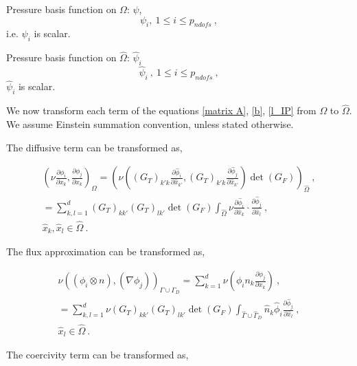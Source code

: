 \documentclass[a4paper,oneside,openright,spanish,english]{book}
\begin{document}
Pressure basis function on $\Omega$: $\psi$,
\begin{equation}
\psi_i, \  1 \leq i \leq p_{ndofs} \ ,
\end{equation}
i.e. $\psi_i$ is scalar.

Pressure basis function on $\hat{\Omega}$: $\hat{\psi}_i$  
\begin{equation}
\hat{\psi}_i \ , \ 1 \leq i \leq p_{ndofs} \ ,
\end{equation}
$\hat{\psi}_i$ is scalar.

We now transform each term of the equations \eqref{matrix A}, \eqref{b}, \eqref{l_IP} from $\Omega$ to $\hat{\Omega}$. We assume Einstein summation convention, unless stated otherwise.

The diffusive term can be transformed as,

\begin{equation}\label{affine_diffusive_term}
\begin{split}
(\nu \frac{\partial \phi_i}{\partial x_k} , \frac{\partial \phi_j}{\partial x_k})_{\Omega} = (\nu ((G_T)_{k'k}\frac{\partial \hat{\phi}_i}{\partial \hat{x}_{k'}}, (G_T)_{k'k}\frac{\partial \hat{\phi}_j}{\partial \hat{x}_{k'}})\det(G_F))_{\hat{\Omega}} \ , \\
= \sum_{k,l=1}^{d} (G_T)_{kk'} (G_T)_{lk'} \det(G_F) \int_{\hat{\Omega}} \nu \frac{\partial \hat{\phi}_i}{\partial \hat{x}_k} \cdot \frac{\partial \hat{\phi}_j}{\partial \hat{x}_l} \ , \\
\hat{x}_k, \hat{x}_l \in \hat{\Omega} \ .
\end{split}
\end{equation}

The flux approximation can be transformed as,

\begin{equation}\label{affine_flux_term}
\begin{split}
\nu ((\phi_i \otimes n),(\nabla \phi_j))_{\Gamma \cup \Gamma_D} = \sum_{k=1}^d \nu (\phi_i n_k \frac{\partial \phi_j}{\partial x_k})\ , \\
= \sum_{k,l=1}^{d} \nu (G_T)_{kk'} (G_T)_{lk'} \det(G_F) \int_{\hat{\Gamma} \cup \hat{\Gamma}_D} \hat{n}_k \hat{\phi}_i \frac{\partial \hat{\phi}_j}{\partial \hat{x}_l} \ , \\
\hat{x}_l \in \hat{\Omega} \ .
\end{split}
\end{equation}

The coercivity term can be transformed as,

\end{document}
